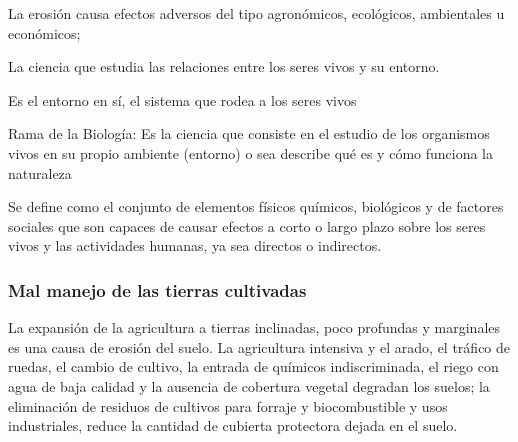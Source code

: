 La erosión causa efectos adversos del tipo agronómicos, ecológicos, ambientales u económicos;
\begin{definition}[Ecología]
    La ciencia que estudia las relaciones entre los seres vivos y su entorno.
\end{definition}
\begin{definition}
    Es el entorno en sí, el sistema que rodea a los seres vivos
\end{definition}
\begin{definition}[Ecología]
    Rama de la Biología: Es la ciencia que consiste en el estudio de los organismos vivos en su propio ambiente (entorno) o sea describe qué es y cómo funciona la naturaleza
\end{definition}
\begin{definition}
    Se define como el conjunto de elementos físicos químicos, biológicos y de factores sociales que son capaces de causar efectos a corto o largo plazo sobre los seres vivos y las actividades humanas, ya sea directos o indirectos.
\end{definition}

\subsubsection{Mal manejo de las tierras cultivadas}
La expansión de la agricultura a tierras inclinadas, poco profundas y marginales es una causa de erosión del suelo. La agricultura intensiva y el arado, el tráfico de ruedas, el cambio de cultivo, la entrada de químicos indiscriminada, el riego con agua de baja calidad y la ausencia de cobertura vegetal degradan los suelos; la eliminación de residuos de cultivos para forraje y biocombustible y usos industriales, reduce la cantidad de cubierta protectora dejada en el suelo.

